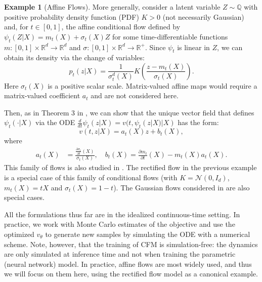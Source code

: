 \documentclass[a4paper,11pt]{article}
\newcommand{\R}{\mathbb{R}}
\theoremstyle{plain}
\theoremstyle{definition}
\newtheorem{exampleinner}[theoreminner]{Example}
\newenvironment{example}[1][]
  {\begin{mdframed}[style=examplestyle]\begin{exampleinner}[#1]}
  {\end{exampleinner}\end{mdframed}}
\begin{document}
\begin{example}[Affine  Flows] \label{ex_gen}
More generally, consider a latent variable $Z \sim \mathbb{Q}$ with positive probability density function (PDF) $K > 0$ (not necessarily Gaussian) and, for $t \in [0,1]$,  the affine conditional flow defined by $\psi_t(Z|X) = m_t(X) + \sigma_t(X) Z$ for some time-differentiable functions $m: [0,1] \times \R^d \to \R^d$ and $\sigma: [0,1] \times \R^d \to \R^+$. Since $\psi_t$ is linear in $Z$, we can obtain its density via the change of variables:
\begin{equation} \label{eq_probpath_affine}
    p_t(z|X) = \frac{1}{\sigma_t^d(X)} K\left(\frac{z-m_t(X)}{\sigma_t(X)} \right).
\end{equation}
Here \(\sigma_t(X)\) is a positive scalar scale. Matrix-valued affine maps would require a matrix-valued coefficient \(a_t\) and are not considered here.

Then, as in Theorem 3 in \cite{lipman2022flow}, we can show that the unique vector field that defines $\psi_t(\cdot | X)$ via the ODE $\frac{d}{dt} \psi_t(z|X) = v(t, \psi_t(z|X) | X)$ has the form: 
\begin{equation}
    v(t, z| X) = a_t(X) z + b_t(X),
\end{equation}
where 
\begin{align} \label{eq_ab}
    a_t(X) &= \frac{\frac{\partial \sigma_t}{\partial t}(X)}{\sigma_t(X)}, \quad 
    b_t(X) = \frac{\partial m_t}{\partial t}(X) - m_t(X) a_t(X).
\end{align}
This family of flows is also studied in \cite{kunkel2025minimax}. The rectified flow in the previous example is a special case of this family of conditional flows (with $K = \mathcal{N}(0, I_d)$,  $m_t(X) = tX$ and $\sigma_t(X) = 1-t$). The Gaussian flows considered in \cite{lipman2022flow, tong2023improving, albergo2023stochastic} are also special cases. 
\end{example}


All the formulations thus far are in the idealized continuous-time setting. In practice, we work with  Monte Carlo estimates of the objective and use the optimized $v_\theta$ to generate new samples by simulating the ODE with a numerical scheme. Note, however, that the training of CFM is simulation-free: the dynamics are only simulated at inference time and not when training the parametric (neural network) model. In practice, affine flows are most widely used, and thus we will focus on them here, using the rectified flow model as a canonical example.
\end{document}

